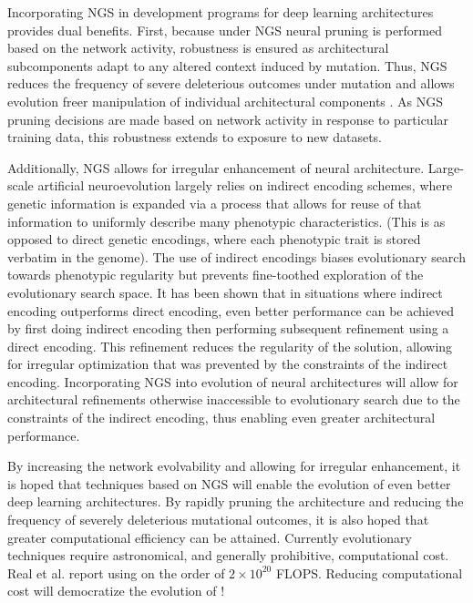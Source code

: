 Incorporating NGS in development programs for deep learning architectures provides dual benefits.
First, because under NGS neural pruning is performed based on the network activity, robustness is ensured as architectural subcomponents adapt to any altered context induced by mutation.
Thus, NGS reduces the frequency of severe deleterious outcomes under mutation and allows evolution freer manipulation of individual architectural components \autocite{downing2015intelligence}.
As NGS pruning decisions are made based on network activity in response to particular training data, this robustness extends to exposure to new datasets.

Additionally, NGS allows for irregular enhancement of neural architecture.
Large-scale artificial neuroevolution largely relies on indirect encoding schemes, where genetic information is expanded via a process that allows for reuse of that information to uniformly describe many phenotypic characteristics.
(This is as opposed to direct genetic encodings, where each phenotypic trait is stored verbatim in the genome).
The use of indirect encodings biases evolutionary search towards phenotypic regularity but prevents fine-toothed exploration of the evolutionary search space.
It has been shown that in situations where indirect encoding outperforms direct encoding, even better performance can be achieved by first doing indirect encoding then performing subsequent refinement using a direct encoding.
This refinement reduces the regularity of the solution, allowing for irregular optimization that was prevented by the constraints of the indirect encoding.
Incorporating NGS into evolution of neural architectures will allow for architectural refinements otherwise inaccessible to evolutionary search due to the constraints of the indirect encoding, thus enabling even greater architectural performance.

By increasing the network evolvability and allowing for irregular enhancement, it is hoped that techniques based on NGS will enable the evolution of even better deep learning architectures.
By rapidly pruning the architecture and reducing the frequency of severely deleterious mutational outcomes, it is also hoped that greater computational efficiency can be attained.
Currently evolutionary techniques require astronomical, and generally prohibitive, computational cost.
Real et al. report using on the order of $2 \times 10^{20}$ FLOPS.
Reducing computational cost will democratize the evolution of !
